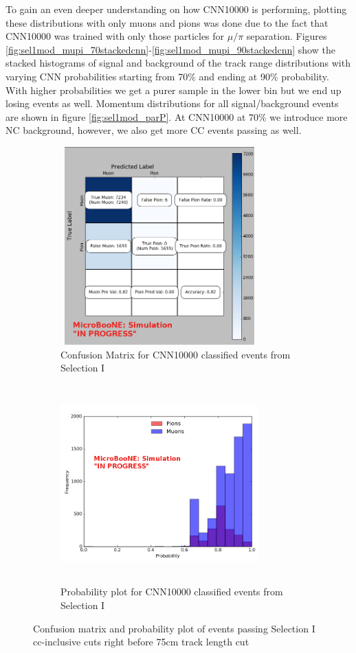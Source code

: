 To gain an even deeper understanding on how CNN10000 is performing, plotting these distributions with only muons and pions was done due to the fact that CNN10000 was trained with only those particles for $\mu/\pi$ separation. Figures \ref{fig:sel1mod_mupi_70stackedcnn}-\ref{fig:sel1mod_mupi_90stackedcnn} show the stacked histograms of signal and background of the track range distributions with varying CNN probabilities starting from 70\% and ending at 90\% probability. With higher probabilities we get a purer sample in the lower bin but we end up losing events as well. Momentum distributions for all signal/background events are shown in figure \ref{fig:sel1mod_parP}. At CNN10000 at 70\% we introduce more NC background, however, we also get more CC events passing as well.   

\begin{figure}[htp!]
\centering
	\begin{subfigure}[b]{.45\textwidth}
	\includegraphics[width=3in,height=3in]{figs/sel1mod_confusion_wrongnorm.png}
	\caption{Confusion Matrix for CNN10000 classified events from Selection I}
	\label{fig:confusion_sel1mod}
	\end{subfigure}
	\quad
	\begin{subfigure}[b]{.45\textwidth}
	\includegraphics[width=3in,height=3in]{figs/probplot_wrongnorm_selImod.png}
	\caption{Probability plot for CNN10000 classified events from Selection I}  
	\label{fig:prob_sel1mod}
	\end{subfigure}
	\quad
\caption{Confusion matrix and probability plot of events passing Selection I cc-inclusive cuts right before 75cm track length cut}
\label{probplots}
\end{figure}

